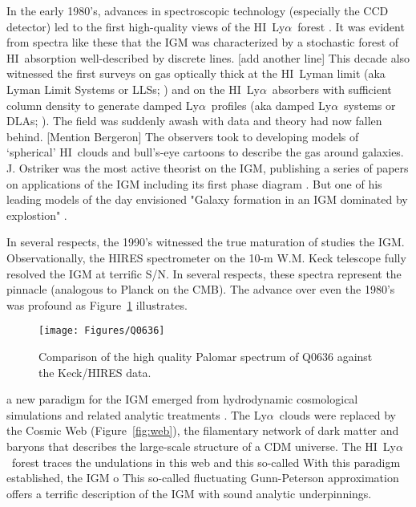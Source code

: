 \documentclass[graybox]{svmult}
\newcommand{\HI}{H{\sc I}}
\def\lya{Ly$\alpha$}
\begin{document}
In the early 1980's, advances in spectroscopic technology
(especially the CCD detector) led to the first high-quality
views of the \HI\ \lya\ forest 
\cite[Figure~\ref{fig:young}]{young78,boks,sargent}.
It was evident from spectra like these that the IGM was
characterized by a stochastic forest of \HI\ absorption
well-described by discrete lines.  [add another line]
This decade also witnessed the first surveys on gas
optically thick at the \HI\ Lyman limit (aka Lyman Limit Systems 
or LLSs; \cite{tytler82})
and on the \HI\ \lya\ absorbers with sufficient column
density to generate damped \lya\ profiles
(aka damped \lya\ systems or DLAs; \cite{wolfe86}).
The field was suddenly awash with data and theory had
now fallen behind.
[Mention Bergeron]
The observers took to developing models of 
`spherical' \HI\ clouds and bull's-eye cartoons to 
describe the gas around galaxies.  
J. Ostriker was the most active theorist on the IGM,
publishing a series of papers on applications of the
IGM including its first phase diagram 
\cite{ostriker83a,ostriker83b,bajtlik87,duncan89}.
But one of his leading models of the day envisioned
"Galaxy formation in an IGM dominated by explostion"
\cite{ostriker80}.


In several respects, the 1990's witnessed the
true maturation of studies the IGM.  Observationally,
the HIRES spectrometer \cite{vogt94} on the 10-m W.M.
Keck telescope fully resolved the IGM at terrific
S/N.  In several respects, these spectra represent
the pinnacle (analogous to Planck on the CMB).
The advance over even the 1980's was profound
as Figure~\ref{fig:HIRES} illustrates.

%
\begin{figure}[b]
\sidecaption
\texttt{[image: Figures/Q0636]}
%
%
\caption{Comparison of the high quality Palomar spectrum
of Q0636 against the Keck/HIRES data.
}
\label{fig:HIRES}       %
\end{figure}


a new paradigm for the IGM emerged
from hydrodynamic cosmological simulations \cite{miralda96}
and related analytic treatments \cite{huixx}.
The \lya\ clouds were replaced by the Cosmic Web (Figure~\ref{fig:web}),
the filamentary network of dark matter and baryons that 
describes the large-scale structure of a CDM universe.
The \HI\ \lya\ forest traces the undulations in this web
and this so-called 
With this paradigm established, the IGM o
This so-called fluctuating Gunn-Peterson approximation
offers a terrific description of the IGM with sound
analytic underpinnings.
\end{document}

